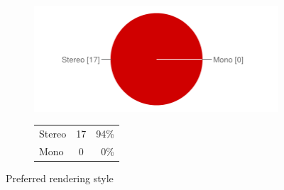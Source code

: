\documentclass[MSc,paper=a4,pagesize=auto]{icldt}
\begin{document}
\begin{figure}[htbp!]
\centering
\begin{subfigure}{0.4\textwidth}
    \centering
    \includegraphics[width=1\linewidth]{resources/15-preferred_use_type}
\end{subfigure}%
\centering
\begin{subfigure}{0.5\textwidth}
    \centering
   	\begin{tabular}{ l c r }
Stereo&17&94\% \\
Mono&0&0\% \\
\end{tabular}
\end{subfigure} 
    \caption{Preferred rendering style}
    \label{fig:15-preferred_use_type}
\end{figure}
\end{document}
